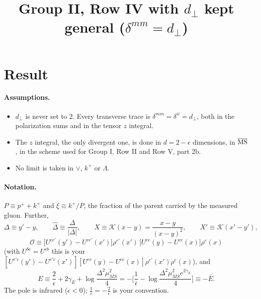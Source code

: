 \documentclass[10pt]{article}
\title{Group II, Row IV with $d_\perp$ kept general ($\delta^{mm}=d_\perp$)}
\date{}
\numberwithin{equation}{section}
\newcommand{\KK}{\mathcal K}
\newcommand{\Dh}{\hat\Delta}
\newcommand{\OO}{\mathcal O}
\begin{document}
\maketitle

\section{Result}\label{sec:result}
\paragraph{Assumptions.}
\begin{itemize}
\item $d_\perp$ is never set to 2. Every transverse trace is $\delta^{mm}=\delta^{ii}=d_\perp$, both in the polarization sums and in the tensor $z$ integral.
\item The $z$ integral, the only divergent one, is done in $d=2-\epsilon$ dimensions, in $\overline{\rm MS}$, in the scheme used for Group I, Row II and Row V, part 2b.
\item No limit is taken in $\vee$, $k^+$ or $\Lambda$.
\end{itemize}
\paragraph{Notation.} $P\equiv p^++k^+$ and $\xi\equiv k^+/P$, the fraction of the parent carried by the measured gluon. Further,
\begin{equation}
\Delta\equiv y'-y,\qquad \Dh\equiv\frac{\Delta}{|\Delta|},\qquad X\equiv\KK(x-y)=\frac{x-y}{(x-y)^2},\qquad X'\equiv\KK(x'-y'),
\end{equation}
\begin{equation}
\OO\equiv\big[U^{ce'}(y')-U^{ce'}(x')\big]\rho^{e'}(x')\,\big[U^{ce}(y)-U^{ce}(x)\big]\rho^{e}(x)
\end{equation}
(with $U^{bc}=U^{cb}$ this is your $[U^{e'c}(y')-U^{e'c}(x')][U^{ec}(y)-U^{ce}(x)]\rho^{e'}(x')\rho^e(x)$), and
\begin{equation}
E\equiv\frac{2}{\epsilon}+2\gamma_E+\log\frac{\Delta^2\mu^2_{\overline{MS}}}{4}=-\Big[\frac{1}{\bar\epsilon}-\log\frac{\Delta^2\mu^2_{\overline{MS}}e^{2\gamma_E}}{4}\Big]\equiv-\bar E .
\label{eq:E}
\end{equation}
The pole is infrared ($\epsilon<0$); $\frac1{\bar\epsilon}=-\frac2\epsilon$ is your convention.
\end{document}
